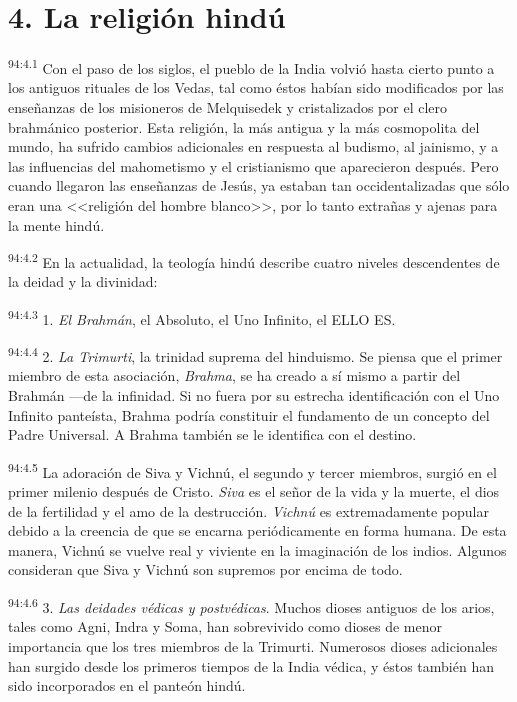 \section*{4. La religión hindú}
\par
\textsuperscript{94:4.1} Con el paso de los siglos, el pueblo de la India volvió hasta cierto punto a los antiguos rituales de los Vedas, tal como éstos habían sido modificados por las enseñanzas de los misioneros de Melquisedek y cristalizados por el clero brahmánico posterior. Esta religión, la más antigua y la más cosmopolita del mundo, ha sufrido cambios adicionales en respuesta al budismo, al jainismo, y a las influencias del mahometismo y el cristianismo que aparecieron después. Pero cuando llegaron las enseñanzas de Jesús, ya estaban tan occidentalizadas que sólo eran una <<religión del hombre blanco>>, por lo tanto extrañas y ajenas para la mente hindú.

\par
\textsuperscript{94:4.2} En la actualidad, la teología hindú describe cuatro niveles descendentes de la deidad y la divinidad:

\par
\textsuperscript{94:4.3} 1. \textit{El Brahmán}, el Absoluto, el Uno Infinito, el ELLO ES.

\par
\textsuperscript{94:4.4} 2. \textit{La Trimurti}, la trinidad suprema del hinduismo. Se piensa que el primer miembro de esta asociación, \textit{Brahma}, se ha creado a sí mismo a partir del Brahmán ---de la infinidad. Si no fuera por su estrecha identificación con el Uno Infinito panteísta, Brahma podría constituir el fundamento de un concepto del Padre Universal. A Brahma también se le identifica con el destino.

\par
\textsuperscript{94:4.5} La adoración de Siva y Vichnú, el segundo y tercer miembros, surgió en el primer milenio después de Cristo. \textit{Siva} es el señor de la vida y la muerte, el dios de la fertilidad y el amo de la destrucción. \textit{Vichnú} es extremadamente popular debido a la creencia de que se encarna periódicamente en forma humana. De esta manera, Vichnú se vuelve real y viviente en la imaginación de los indios. Algunos consideran que Siva y Vichnú son supremos por encima de todo.

\par
\textsuperscript{94:4.6} 3. \textit{Las deidades védicas y postvédicas}. Muchos dioses antiguos de los arios, tales como Agni, Indra y Soma, han sobrevivido como dioses de menor importancia que los tres miembros de la Trimurti. Numerosos dioses adicionales han surgido desde los primeros tiempos de la India védica, y éstos también han sido incorporados en el panteón hindú.

